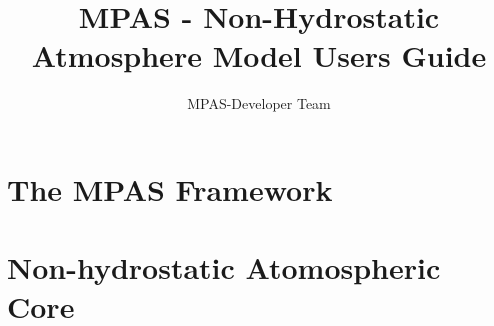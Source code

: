 \documentclass[11pt]{report}
\begin{document}
\title{MPAS - Non-Hydrostatic Atmosphere Model Users Guide}



\author{MPAS-Developer Team}

\maketitle
\tableofcontents

\part{The MPAS Framework}



%

\part{Non-hydrostatic Atomospheric Core}





\end{document}
